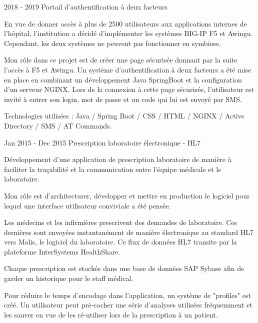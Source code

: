 \begin{cventries}
{    }
    
    
  \cventry
    {2018 - 2019} %
    {Portail d'authentification à deux facteurs} %
    {} %
    {} %
    {
    En vue de donner accès à plus de 2500 utilisateurs aux applications internes de l'hôpital, l'institution a décidé d'implémenter les systèmes BIG-IP F5 et Awingu. Cependant, les deux systèmes ne peuvent pas fonctionner en symbiose. 
    
    Mon rôle dans ce projet est de créer une page sécurisée donnant par la suite l'accès à F5 et Awingu. 
    Un système d'authentification à deux facteurs a été mise en place en combinant un développement Java SpringBoot et la configuration d'un serveur NGINX. Lors de la connexion à cette page sécurisée, l'utilisateur est invité à entrer son login, mot de passe et un code qui lui est envoyé par SMS.

    Technologies utilisées : Java / Spring Boot / CSS / HTML / NGINX / Active Directory / SMS / AT Commands.

    }
    
    
    
    
  \cventry
    {Jan 2015 - Dec 2015} %
    {Prescription laboratoire électronique - HL7} %
    {} %
    {} %
    {
    Développement d'une application de prescription laboratoire de manière à faciliter la traçabilité et la communication entre l'équipe médicale et le laboratoire. 

    Mon rôle est d'architecturer, développer et mettre en production le logiciel pour lequel une interface utilisateur conviviale a été pensée. 

    Les médecins et les infirmières prescrivent des demandes de laboratoire. Ces dernières sont envoyées instantanément de manière électronique au standard HL7 vers Molis, le logiciel du laboratoire.
    Ce flux de données HL7 transite par la plateforme InterSystems HealthShare.
    
    Chaque prescription est stockée dans une base de données SAP Sybase afin de garder un historique pour le staff médical.
    
    Pour réduire le temps d'encodage dans l'application, un système de "profiles" est créé. Un utilisateur peut pré-cocher une série d'analyses utilisées fréquemment et les sauver en vue de les ré-utiliser lors de la prescription à un patient. 

}
\end{cventries}
